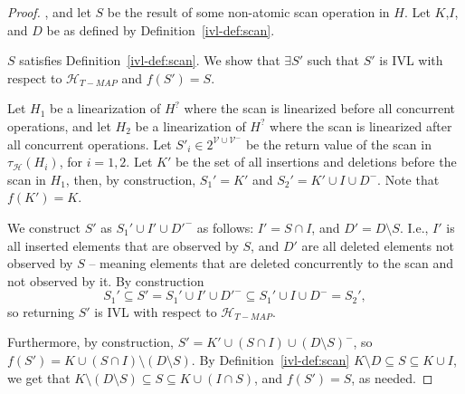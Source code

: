 \begin{proof}
,
and let $S$ be the result
of some non-atomic scan operation in $H$. Let $K$,$I$, and $D$ be as defined by
Definition~\ref{ivl-def:scan}.

$S$ satisfies Definition~\ref{ivl-def:scan}. We show that $\exists S'$ such that $S'$
is IVL with respect to $\mathcal{H}_{T-MAP}$ and $f(S')=S$.

Let $H_1$ be a linearization of $H^?$ where the scan is linearized before all concurrent operations,
and let $H_2$ be a linearization of $H^?$ where the scan is linearized after all concurrent operations.
Let ${S'}_i \in 2^{\mathcal{V} \cup \mathcal{V}^-} $ be the return value of the scan in $\tau_\mathcal{H}(H_i)$,
for $i=1,2$. Let $K'$ be the set of all insertions and deletions before the scan in $H_1$,
then, by construction, $S_1' = K'$ and $S_2' = K' \cup {I \cup D^-}$. Note that $f(K')=K$.

We construct $S'$ as $S_1' \cup I' \cup D'^-$ as follows: $I' = S \cap I$, and $D' = D \setminus S$.
I.e., $I'$ is all inserted elements that are observed by $S$, and $D'$ are all deleted
elements not observed by $S$ -- meaning elements that are deleted concurrently to the scan
and not observed by it. By construction
\[ S_1' \subseteq S' = S_1' \cup I' \cup {D'}^- \subseteq S_1' \cup I \cup D^- = S_2', \]
so returning $S'$ is IVL with respect to $\mathcal{H}_{T-MAP}$.

Furthermore, by construction, $S'=K' \cup (S \cap I) \cup (D \setminus S)^-$, so
$f(S')=K \cup (S \cap I) \setminus (D \setminus S)$. By Definition~\ref{ivl-def:scan}
$K \setminus D \subseteq S \subseteq K \cup I$, we get that
$K \setminus (D \setminus S) \subseteq S \subseteq K \cup (I \cap S)$, and $f(S')=S$, as needed.
\end{proof}

